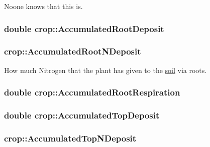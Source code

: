 Noone knows that this is. \hypertarget{classcrop_a29dcfc8e28d3f6689a94184c968a1882}{
\subsubsection[{AccumulatedRootDeposit}]{\setlength{\rightskip}{0pt plus 5cm}double {\bf crop::AccumulatedRootDeposit}}}
\label{classcrop_a29dcfc8e28d3f6689a94184c968a1882}
\hypertarget{classcrop_aa050617ad81407650b6bd3150b8c5b93}{
\subsubsection[{AccumulatedRootNDeposit}]{ {\bf crop::AccumulatedRootNDeposit}}}
\label{classcrop_aa050617ad81407650b6bd3150b8c5b93}


How much Nitrogen that the plant has given to the \hyperlink{classsoil}{soil} via roots. \hypertarget{classcrop_a9342a07dc579e1e3169eba7060741339}{
\subsubsection[{AccumulatedRootRespiration}]{\setlength{\rightskip}{0pt plus 5cm}double {\bf crop::AccumulatedRootRespiration}}}
\label{classcrop_a9342a07dc579e1e3169eba7060741339}
\hypertarget{classcrop_a9bf4f47a0a193df878aa15b364dbec14}{
\subsubsection[{AccumulatedTopDeposit}]{\setlength{\rightskip}{0pt plus 5cm}double {\bf crop::AccumulatedTopDeposit}}}
\label{classcrop_a9bf4f47a0a193df878aa15b364dbec14}
\hypertarget{classcrop_ad9583ee2f76a5141a1a54ebea83627fe}{
\subsubsection[{AccumulatedTopNDeposit}]{ {\bf crop::AccumulatedTopNDeposit}}}
\label{classcrop_ad9583ee2f76a5141a1a54ebea83627fe}


